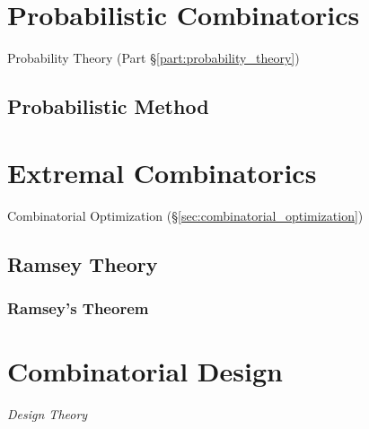 \section{Probabilistic Combinatorics}\label{sec:probabilistic_combinatorics}

Probability Theory (Part \S\ref{part:probability_theory})



\subsection{Probabilistic Method}\label{sec:probabilistic_method}



\section{Extremal Combinatorics}\label{sec:extremal_combinatorics}

Combinatorial Optimization (\S\ref{sec:combinatorial_optimization})



\subsection{Ramsey Theory}\label{sec:ramsey_theory}

\subsubsection{Ramsey's Theorem}\label{sec:ramseys_theorem}



\section{Combinatorial Design}\label{sec:combinatorial_design}

\emph{Design Theory}
